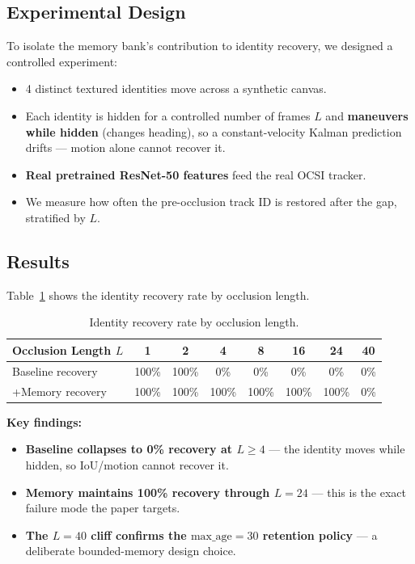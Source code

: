 \documentclass[11pt,a4paper]{article}
\begin{document}
\subsection{Experimental Design}
To isolate the memory bank's contribution to identity recovery, we designed a controlled experiment:
\begin{itemize}[leftmargin=2em]
    \item 4 distinct textured identities move across a synthetic canvas.
    \item Each identity is hidden for a controlled number of frames $L$ and \textbf{maneuvers while hidden} (changes heading), so a constant-velocity Kalman prediction drifts --- motion alone cannot recover it.
    \item \textbf{Real pretrained ResNet-50 features} feed the real OCSI tracker.
    \item We measure how often the pre-occlusion track ID is restored after the gap, stratified by $L$.
\end{itemize}

\subsection{Results}
Table~\ref{tab:occlusion} shows the identity recovery rate by occlusion length.

\begin{table}[H]
\centering
\caption{Identity recovery rate by occlusion length.}
\label{tab:occlusion}
\begin{tabular}{@{}lccccccc@{}}
\toprule
\textbf{Occlusion Length $L$} & \textbf{1} & \textbf{2} & \textbf{4} & \textbf{8} & \textbf{16} & \textbf{24} & \textbf{40} \\
\midrule
Baseline recovery & 100\% & 100\% & 0\% & 0\% & 0\% & 0\% & 0\% \\
+Memory recovery & 100\% & 100\% & 100\% & 100\% & 100\% & 100\% & 0\% \\
\bottomrule
\end{tabular}
\end{table}

\textbf{Key findings:}
\begin{itemize}[leftmargin=2em]
    \item \textbf{Baseline collapses to 0\% recovery at $L \geq 4$} --- the identity moves while hidden, so IoU/motion cannot recover it.
    \item \textbf{Memory maintains 100\% recovery through $L = 24$} --- this is the exact failure mode the paper targets.
    \item \textbf{The $L = 40$ cliff confirms the $\text{max\_age} = 30$ retention policy} --- a deliberate bounded-memory design choice.
\end{itemize}
\end{document}
